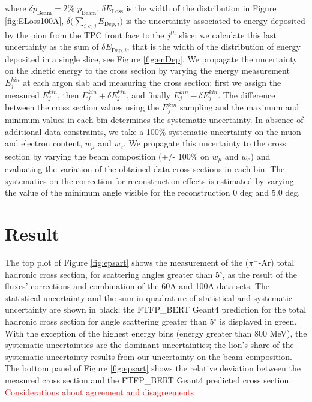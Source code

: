 \documentclass[aps,prl,twocolumn,showpacs,superscriptaddress,groupedaddress]{revtex4}  %
\begin{document}
where $\delta p_{\text{Beam}} = 2\%$ $p_{\text{Beam}}$, $\delta E_{\text{Loss}}$ is the width of the distribution in Figure \ref{fig:ELoss100A}, $\delta \Big(\sum_{i < j} E_{\text{Dep},i}\Big)$  is the uncertainty associated to energy deposited by the pion from the TPC front face to the $j^{th}$ slice; we calculate this last uncertainty as  the sum of $\delta E_{\text{Dep},i}$, that is the width  of the  distribution of energy deposited in a single slice, see Figure \ref{fig:enDep}. We propagate the uncertainty on the kinetic energy to the cross section by varying the energy measurement $E^{kin}_{j}$ at each argon slab and measuring the cross section: first we assign the measured $E^{kin}_{j}$, then  $E^{kin}_{j} + \delta E^{kin}_{j}$, and finally  $E^{kin}_{j} - \delta E^{kin}_{j}$. The difference between the cross section values using the $E^{kin}_{j}$ sampling and the maximum and minimum values in each bin determines the systematic uncertainty.
In absence of additional data constraints,  we take a 100\% systematic uncertainty on the muon and electron content, $w_\mu$ and $w_e$.  We propagate this uncertainty  to the cross section by varying the beam composition (+/- 100\% on $w_\mu$ and $w_e$) and evaluating the variation of the obtained  data cross sections in each bin.  The systematics on the correction for reconstruction effects is estimated by varying the value of the minimum angle visible for the reconstruction 0 deg and 5.0 deg. 



\section{\label{sec:Results}Result}
The top plot of Figure \ref{fig:epsart} shows the measurement of the ($\pi^-$-Ar) total hadronic cross section,  for  scattering angles greater than 5$^\circ$, as the result of the fluxes' corrections and combination of the 60A and 100A data sets. The statistical uncertainty and the sum in quadrature of statistical and systematic uncertainty are shown in black;  the FTFP\_BERT Geant4 prediction for the total hadronic cross section for angle scattering greater than 5$^\circ$ is displayed in green. 
With the exception of the highest energy bins (energy greater than 800 MeV), the systematic uncertainties are the dominant uncertainties; the lion's share of the systematic uncertainty results from our uncertainty on the beam composition. The bottom panel of Figure  \ref{fig:epsart} shows the relative deviation between the measured cross section and the FTFP\_BERT  Geant4 predicted cross section.
\textcolor{red}{Considerations about agreement and disagreements}
\end{document}
